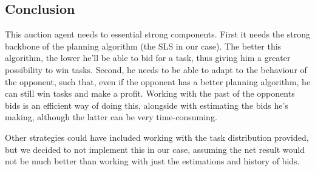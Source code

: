 \documentclass[12pt,a4paper]{article}
\begin{document}
\subsection*{Conclusion}
This auction agent needs to essential strong components. First it needs the strong backbone of the planning algorithm (the SLS in our case). The better this algorithm, the lower he'll be able to bid for a task, thus giving him a greater possibility to win tasks. Second, he needs to be able to adapt to the behaviour of the opponent, such that, even if the opponent has a better planning algorithm, he can still win tasks and make a profit. Working with the past of the opponents bids is an efficient way of doing this, alongside with estimating the bids he's making, although the latter can be very time-consuming. 

Other strategies could have included working with the task distribution provided, but we decided to not implement this in our case, assuming the net result would not be much better than working with just the estimations and history of bids.
\end{document}
